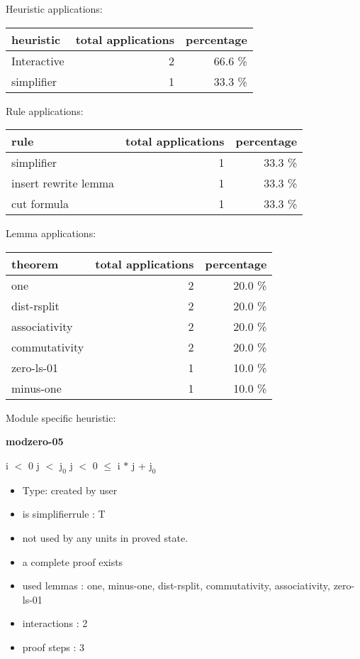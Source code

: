\documentclass[a4paper]{article}
\begin{document}
\medskip


Heuristic applications:

\begin{supertabular}{l|r|r}
heuristic	& total applications & percentage \\ \hline
Interactive & 2 & 66.6 \% \\
simplifier & 1 & 33.3 \% \\

\end{supertabular}

Rule applications:

\begin{supertabular}{l|r|r}
rule	        & total applications & percentage \\ \hline
simplifier & 1 & 33.3 \% \\
insert rewrite lemma & 1 & 33.3 \% \\
cut formula & 1 & 33.3 \% \\

\end{supertabular}

Lemma applications:

\begin{supertabular}{l|r|r}
theorem	        & total applications & percentage \\ \hline
one & 2 & 20.0 \% \\
dist-rsplit & 2 & 20.0 \% \\
associativity & 2 & 20.0 \% \\
commutativity & 2 & 20.0 \% \\
zero-ls-01 & 1 & 10.0 \% \\
minus-one & 1 & 10.0 \% \\

\end{supertabular}

Module specific heuristic:

\pagebreak

{\LARGE\bf modzero-05}\label{lemma-modzero-05}

\medskip

 \Fol i $<$ 0 \And j $<$ $\mbox{j}_{0}$ \And j $<$ 0  $\le$ i $*$ j + $\mbox{j}_{0}$

\begin{itemize}

\item Type: created by user

\item is simplifierrule : T
\item not used by any units in proved state.
\item       a complete proof exists
\item       used lemmas  : one, minus-one, dist-rsplit, commutativity, associativity, zero-ls-01
\item       interactions : 2
\item       proof steps  : 3
\end{itemize}
\end{document}
